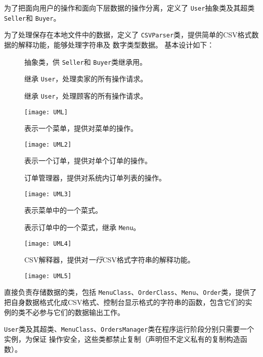 \documentclass[adobefonts,a4paper]{ctexart}
\begin{document}
为了把面向用户的操作和面向下层数据的操作分离，定义了 \verb|User|抽象类及其超类 \verb|Seller|和 \verb|Buyer|。

为了处理保存在本地文件中的数据，定义了 \verb|CSVParser|类，提供简单的CSV格式数据的解释功能，能够处理字符串及
数字类型数据。
\newpage
基本设计如下：
\begin{description}
 
 \item[] 抽象类，供 \verb|Seller|和 \verb|Buyer|类继承用。
 
 \item[] 继承 \verb|User|，处理卖家的所有操作请求。
 
 \item[] 继承 \verb|User|，处理顾客的所有操作请求。
 
 \texttt{[image: UML]}
 
 \item[] 表示一个菜单，提供对菜单的操作。
 
 \texttt{[image: UML2]}
 
 \item[] 表示一个订单，提供对单个订单的操作。
 
 \item[] 订单管理器，提供对系统内订单列表的操作。
 
 \texttt{[image: UML3]}
 
 \item[] 表示菜单中的一个菜式。
 
 \item[] 表示订单中的一个菜式，继承 \verb|Menu|。
 
 \texttt{[image: UML4]}
 
 \item[] CSV解释器，提供对\emph{一行}CSV格式字符串的解释功能。
 
 \texttt{[image: UML5]}
 
\end{description}

直接负责存储数据的类，包括 \verb|MenuClass|、\verb|OrderClass|、\verb|Menu|、\verb|Order|类，提供了
把自身数据格式化成CSV格式、控制台显示格式的字符串的函数，包含它们的实例的类不必参与它们的数据输出工作。

\verb|User|类及其超类、\verb|MenuClass|、\verb|OrdersManager|类在程序运行阶段分别只需要一个实例，为保证
操作安全，这些类都禁止复制（声明但不定义私有的复制构造函数）。
\end{document}
